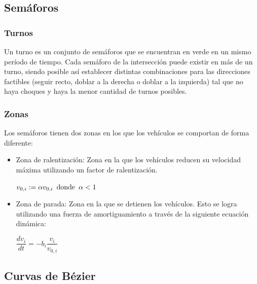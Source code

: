 \documentclass[colorinlistoftodos,twoside,twocolumn]{article} %
\begin{document}
 
	\subsection{Semáforos}
	
	\subsubsection{Turnos}
	
	Un turno es un conjunto de sem\'aforos que se encuentran en verde en un mismo per\'iodo de tiempo. Cada sem\'aforo de la intersecci\'on puede existir en m\'as de un turno, siendo posible as\'i establecer distintas combinaciones para las direcciones factibles (seguir recto, doblar a la derecha o doblar a la izquierda) tal que no haya choques y haya la menor cantidad de turnos posibles. 
	
	\subsubsection{Zonas}
	
	Los sem\'aforos tienen dos zonas en los que los veh\'iculos se comportan de forma diferente:
	\begin{itemize}
		\item Zona de ralentización: Zona en la que los vehículos reducen su velocidad máxima utilizando un factor de ralentización.
		\begin{center}
			$ v_{0,i} := \alpha v_{0,i} \hspace{0.5em} \text{donde} \hspace{0.5em} \alpha < 1$
		\end{center}
		\item Zona de parada: Zona en la que se detienen los vehículos. Esto se logra utilizando una fuerza de amortiguamiento a través de la siguiente ecuación dinámica:
		\begin{center}
			$ \dfrac{dv_{i}}{dt} = -b_{i} \dfrac{v_{i}}{v_{0,i}} $
		\end{center}
	\end{itemize}
	
	\subsection{Curvas de Bézier}
	
\end{document}
